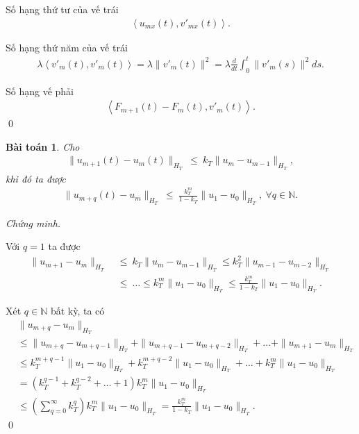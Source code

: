 \documentclass[12pt,a4paper]{article}
\def\N{\mathbb{N}}
\newtheorem{theorem}{Bài toán}[section]
\theoremstyle{definition}
\begin{document}
Số hạng thứ tư của vế trái
\begin{align*}
    [\mu_{m+1}(t) - \mu_m(t)] \left<u_{mx}(t), v'_{mx}(t)\right>.
\end{align*}

Số hạng thứ năm của vế trái
\begin{align*}
    \lambda \left<v'_m(t),v'_m(t)\right> = \lambda \|v'_m(t)\|^2 = \lambda \frac{d}{dt}\int_0^t \|v'_m(s)\|^2 ds.
\end{align*}

Số hạng vế phải
\begin{align*}
    \left<F_{m+1}(t) - F_m(t),v'_m(t)\right>.
\end{align*} \qed

\begin{theorem}
    Cho
    \begin{align*}
        \|u_{m+1}(t) - u_m(t)\|_{H_T} \ \le \ k_T \|u_m - u_{m-1}\|_{H_T},
    \end{align*}
    khi đó ta được
    \begin{align*}
        \|u_{m+q}(t) - u_m\|_{H_T} \ \le \ \frac{k_T^m}{1 - k_T} \|u_1 - u_0\|_{H_T},\ \forall q \in \N.
    \end{align*}
\end{theorem}

\textit{Chứng minh.}

Với $q = 1$ ta được
\begin{align*}
    \|u_{m+1} - u_m\|_{H_T}
    \ &\le \ k_T \|u_m - u_{m-1}\|_{H_T} \le k_T^2 \|u_{m-1} - u_{m-2}\|_{H_T}\\
    &\le \ \dots \le k_T^m \|u_1 - u_0\|_{H_T} \le \frac{k_T^m}{1 - k_T} \|u_1 - u_0\|_{H_T}.
\end{align*}

Xét $q \in \N$ bất kỳ, ta có
\begin{align*}
    &\|u_{m+q} - u_m\|_{H_T} \\
    &\le \|u_{m+q} - u_{m+q-1}\|_{H_T} + \|u_{m+q-1} - u_{m+q-2}\|_{H_T} + \dots + \|u_{m+1} - u_m\|_{H_T} \\
    &\le k_T^{m+q-1} \|u_1 - u_0\|_{H_T} + k_T^{m+q-2} \|u_1 - u_0\|_{H_T} + \dots + k_T^m \|u_1 - u_0\|_{H_T} \\
    &= \left( k_T^{q-1} + k_T^{q-2} + \dots + 1\right) k_T^m \|u_1 - u_0\|_{H_T} \\
    &\le \left(\sum_{q=0}^\infty k_T^q\right) k_T^m \|u_1 - u_0\|_{H_T}
    = \frac{k_T^m}{1 - k_T} \|u_1 - u_0\|_{H_T}.
\end{align*} \qed
\end{document}
